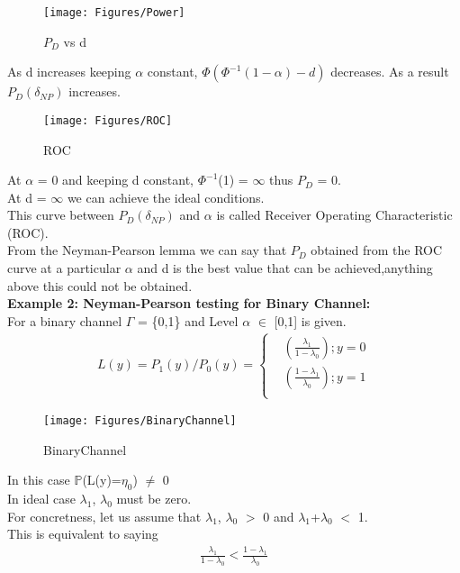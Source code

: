 \documentclass[12pt]{report}
\begin{document}
\begin{figure}[h]
\centering
\texttt{[image: Figures/Power]}
\caption{$P_D$ vs d}
\label{fig:$P_D$ vs d}
\end{figure}
As d increases keeping $\alpha$ constant, $\Phi(\Phi^{-1}(1-\alpha)-d)$ decreases.
As a result $P_D(\delta_{NP})$ increases.\\
\begin{figure}[h]
\centering
\texttt{[image: Figures/ROC]}
\caption{ROC}
\label{fig:ROC}
\end{figure}
At $\alpha$ = 0 and keeping d constant, $\Phi^{-1}$(1) = $\infty$ thus $P_D$ = 0.\\
At d = $\infty$ we can achieve the ideal conditions.\\ 
This curve between  $P_D(\delta_{NP})$ and $\alpha$ is called Receiver Operating Characteristic (ROC).\\
From the Neyman-Pearson lemma we can say that $P_D$ obtained from the ROC curve at a particular $\alpha$ and d is the best value that can be achieved,anything above this could not be obtained.\\[80pt]
{\bf Example 2: Neyman-Pearson testing for Binary Channel:}\\
For a binary channel $\Gamma$ = \{0,1\} and
Level $\alpha$ $\in$ [0,1] is given.\\[-10pt]
\begin{align*}
L(y) = P_1(y)/P_0(y) = \begin{cases}& (\frac{\lambda_1}{1-\lambda_0}) ; y=0\\
& (\frac{1-\lambda_1}{\lambda_0}) ; y=1\\
\end{cases}
\end{align*}
\begin{figure}[h]
\centering
\texttt{[image: Figures/BinaryChannel]}
\caption{BinaryChannel}
\label{fig:binarychannel}
\end{figure}
In this case $\mathbb{P}$(L(y)=$\eta_0$) $\ne$ 0\\ 
In ideal case $\lambda_1$, $\lambda_0$ must be zero.\\
For concretness, let us assume that  $\lambda_1$, $\lambda_0$ $>$ 0 and $\lambda_1$+$\lambda_0$ $<$ 1.\\
This is equivalent to saying 
\begin{align*}
\frac{\lambda_1}{1-\lambda_0} < \frac{1-\lambda_1}{\lambda_0}\\
\end{align*}
\end{document}
